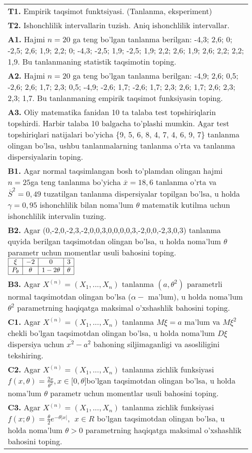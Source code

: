 \documentclass{article}
\begin{document}
\begin{tabular}{m{17cm}}
\textbf{T1.} 
Empirik taqsimot funktsiyasi. (Tanlanma, eksperiment)
\\
\textbf{T2.} 
Ishonchlilik intervallarin tuzish. Aniq ishonchlilik intervallar.
\\
\textbf{A1.} 
Hajmi \(n = 20\) ga teng bo'lgan tanlanma berilgan: -4,3; 2,6; 0; -2,5; 2,6; 1,9; 2,2; 0; -4,3; -2,5; 1,9; -2,5; 1,9; 2,2; 2,6; 1,9; 2,6; 2,2; 2,2; 1,9. Bu tanlanmaning statistik taqsimotin toping.
\\
\textbf{A2.} 
Hajmi \(n = 20\) ga teng bo'lgan tanlanma berilgan: -4,9; 2,6; 0,5; -2,6; 2,6; 1,7; 2,3; 0,5; -4,9; -2,6; 1,7; -2,6; 1,7; 2,3; 2,6; 1,7; 2,6; 2,3; 2,3; 1,7. Bu tanlanmaning empirik taqsimot funksiyasin toping.
\\
\textbf{A3.} 
Oliy matematika fanidan 10 ta talaba test topshiriqlarin topshirdi. Harbir talaba 10 balgacha to'plashi mumkin. Agar test topshiriqlari natijalari bo'yicha \{9, 5, 6, 8, 4, 7, 4, 6, 9, 7\} tanlanma olingan bo'lsa, ushbu tanlanmalarning tanlanma o'rta va tanlanma dispersiyalarin toping.
\\
\textbf{B1.} 
Agar normal taqsimlangan bosh to'plamdan olingan hajmi \(n = 25\)ga teng tanlanma bo'yicha \(\overline{x} = 18,6\) tanlanma o'rta va \({\overline{S}}^{2} = 0,49\) tuzatilgan tanlanma dispersiyalar topilgan bo'lsa, u holda \(\gamma = 0,95\) ishonchlilik bilan noma'lum \(\theta\) matematik kutilma uchun ishonchlilik intervalin tuzing.
\\
\textbf{B2.} 
Agar (0,-2,0,-2,3,-2,0,0,3,0,0,0,0,3,-2,0,0,-2,3,0,3) tanlanma quyida berilgan taqsimotdan olingan bo'lsa, u holda noma'lum \(\theta\) parametr uchun momentlar usuli bahosini toping.
$\begin{array}{|c|c|c|c|}
    \hline
    \xi & - 2 & 0 & 3 \\
    \hline
    P_{\theta} & \theta & 1 - 2\theta & \theta \\
    \hline
\end{array}$
\\
\textbf{B3.} 
Agar \(X^{(n)} = \left( X_{1},...,X_{n} \right)\) tanlanma \(\left( a,\theta^{2} \right)\) parametrli normal taqsimotdan olingan bo'lsa (\(\alpha -\) ma'lum), u holda noma'lum \(\theta^{2}\) parametrning haqiqatga maksimal o'xshashlik bahosini toping.
\\
\textbf{C1.} 
Agar \(X^{(n)} = \left( X_{1},...,X_{n} \right)\) tanlanma \(M\xi = a\) ma'lum va \(M\xi^{2}\) chekli bo'lgan taqsimotdan olingan bo'lsa, u holda noma'lum \(D\xi\) dispersiya uchun \(\overline{x^{2}} - a^{2}\) bahoning siljimaganligi va asosliligini tekshiring.
\\
\textbf{C2.} 
Agar \(X^{(n)} = \left( X_{1},...,X_{n} \right)\) tanlanma zichlik funksiyasi\(f(x,\theta) = \frac{2x}{\theta^{2}},x \in \lbrack 0,\theta\rbrack\)bo'lgan taqsimotdan olingan bo'lsa, u holda noma'lum \(\theta\) parametr uchun momentlar usuli bahosini toping.
\\
\textbf{C3.} 
Agar \(X^{(n)} = \left( X_{1},...,X_{n} \right)\) tanlanma zichlik funksiyasi\(f(x;\theta) = \frac{\theta}{2}e^{- \theta|x|},\ \ x \in R\) bo'lgan taqsimotdan olingan bo'lsa, u holda noma'lum \(\theta > 0\) parametrning haqiqatga maksimal o'xshashlik bahosini toping.
\\


\end{tabular}
\end{document}
